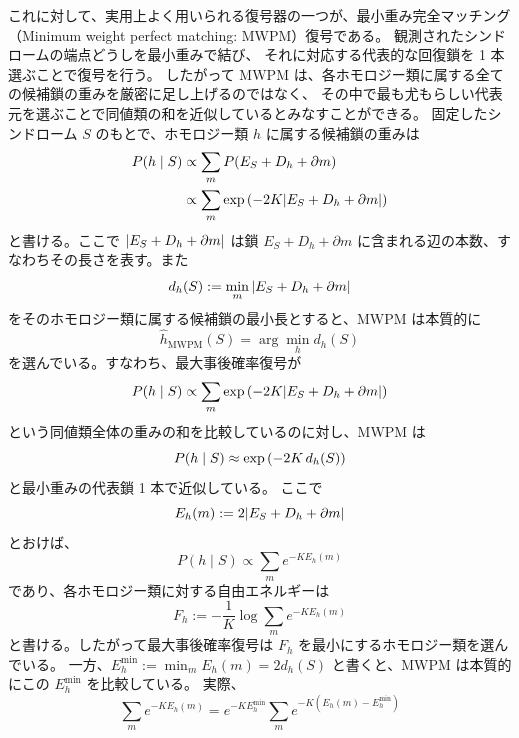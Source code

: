 \documentclass[../master.tex]{subfiles}
\begin{document}
これに対して、実用上よく用いられる復号器の一つが、最小重み完全マッチング（Minimum weight perfect matching: MWPM）復号である。
観測されたシンドロームの端点どうしを最小重みで結び、
それに対応する代表的な回復鎖を 1 本選ぶことで復号を行う。
したがって MWPM は、各ホモロジー類に属する全ての候補鎖の重みを厳密に足し上げるのではなく、
その中で最も尤もらしい代表元を選ぶことで同値類の和を近似しているとみなすことができる。
固定したシンドローム \(S\) のもとで、ホモロジー類 \(h\) に属する候補鎖の重みは
\begin{equation}\begin{aligned}[b]
    P(h\mid S)
    &\propto \sum_m P(E_S+D_h+\partial m)\\
    &\propto \sum_m \exp\qty(-2K\abs{E_S+D_h+\partial m})
\end{aligned}\end{equation}
と書ける。ここで \(\abs{E_S+D_h+\partial m}\) は鎖 \(E_S+D_h+\partial m\) に含まれる辺の本数、すなわちその長さを表す。また
\begin{equation}
    d_h(S):=\min_m \abs{E_S+D_h+\partial m}
\end{equation}
をそのホモロジー類に属する候補鎖の最小長とすると、MWPM は本質的に
\begin{equation}
    \hat h_{\mathrm{MWPM}}(S)=\arg\min_h d_h(S)
\end{equation}
を選んでいる。すなわち、最大事後確率復号が
\begin{equation}
    P(h\mid S)\propto \sum_m \exp\qty(-2K\abs{E_S+D_h+\partial m})
\end{equation}
という同値類全体の重みの和を比較しているのに対し、MWPM は
\begin{equation}
    P(h\mid S)\approx \exp\qty(-2K\,d_h(S))
\end{equation}
と最小重みの代表鎖 1 本で近似している。
ここで
\begin{equation}
    E_h(m):=2\abs{E_S+D_h+\partial m}
\end{equation}
とおけば、
\begin{equation}
    P(h\mid S)\propto \sum_m e^{-K E_h(m)}
\end{equation}
であり、各ホモロジー類に対する自由エネルギーは
\begin{equation}
    F_h:=-\frac{1}{K}\log \sum_m e^{-K E_h(m)}
\end{equation}
と書ける。したがって最大事後確率復号は \(F_h\) を最小にするホモロジー類を選んでいる。
一方、\(E_h^{\min}:=\min_m E_h(m)=2d_h(S)\) と書くと、MWPM は本質的にこの \(E_h^{\min}\) を比較している。
実際、
\begin{equation}
    \sum_m e^{-K E_h(m)}
    =
    e^{-K E_h^{\min}}
    \sum_m e^{-K(E_h(m)-E_h^{\min})}
\end{equation}
\end{document}
